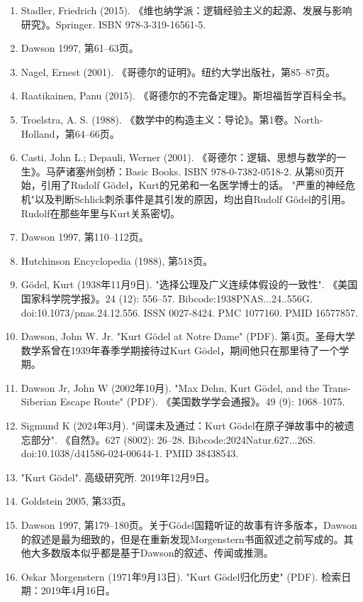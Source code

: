 \begin{enumerate}
\item Stadler, Friedrich (2015). 《维也纳学派：逻辑经验主义的起源、发展与影响研究》。Springer. ISBN 978-3-319-16561-5.  
\item Dawson 1997, 第61–63页。  
\item Nagel, Ernest (2001). 《哥德尔的证明》。纽约大学出版社，第85–87页。  
\item Raatikainen, Panu (2015). 《哥德尔的不完备定理》。斯坦福哲学百科全书。  
\item Troelstra, A. S. (1988). 《数学中的构造主义：导论》。第1卷。North-Holland，第64–66页。  
\item Casti, John L.; Depauli, Werner (2001). 《哥德尔：逻辑、思想与数学的一生》。马萨诸塞州剑桥：Basic Books. ISBN 978-0-7382-0518-2. 从第80页开始，引用了Rudolf Gödel，Kurt的兄弟和一名医学博士的话。 "严重的神经危机"以及判断Schlick刺杀事件是其引发的原因，均出自Rudolf Gödel的引用。Rudolf在那些年里与Kurt关系密切。  
\item Dawson 1997, 第110–112页。  
\item Hutchinson Encyclopedia (1988), 第518页。  
\item Gödel, Kurt (1938年11月9日). "选择公理及广义连续体假设的一致性". 《美国国家科学院学报》。24 (12): 556–57. Bibcode:1938PNAS...24..556G. doi:10.1073/pnas.24.12.556. ISSN 0027-8424. PMC 1077160. PMID 16577857.
\item Dawson, John W. Jr. "Kurt Gödel at Notre Dame" (PDF). 第4页。圣母大学数学系曾在1939年春季学期接待过Kurt Gödel，期间他只在那里待了一个学期。  
\item Dawson Jr, John W (2002年10月). "Max Dehn, Kurt Gödel, and the Trans-Siberian Escape Route" (PDF). 《美国数学学会通报》。49 (9): 1068–1075.  
\item Sigmund K (2024年3月). "间谍未及通过：Kurt Gödel在原子弹故事中的被遗忘部分". 《自然》。627 (8002): 26–28. Bibcode:2024Natur.627...26S. doi:10.1038/d41586-024-00644-1. PMID 38438543.  
\item "Kurt Gödel". 高级研究所. 2019年12月9日。  
\item Goldstein 2005, 第33页。  
\item Dawson 1997, 第179–180页。关于Gödel国籍听证的故事有许多版本，Dawson的叙述是最为细致的，但是在重新发现Morgenstern书面叙述之前写成的。其他大多数版本似乎都是基于Dawson的叙述、传闻或推测。  
\item Oskar Morgenstern (1971年9月13日). "Kurt Gödel归化历史" (PDF). 检索日期：2019年4月16日。
\end{enumerate}